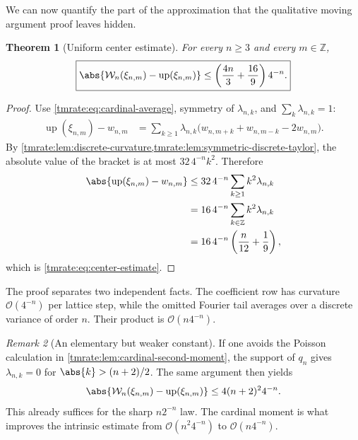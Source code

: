 \documentclass[11pt,oneside]{article}
\newtheorem{theorem}{Theorem}[section]
\theoremstyle{definition}
\theoremstyle{remark}
\newtheorem{remark}[theorem]{Remark}
\newcommand{\Z}{\mathbb Z}
\newcommand{\Up}{\operatorname{up}}
\newcommand{\bigO}{\mathcal O}
\begin{document}
We can now quantify the part of the approximation that the qualitative moving
argument proof leaves hidden.

\begin{theorem}[Uniform center estimate]
\label{tmrate:thm:center-estimate}
For every $n\ge3$ and every $m\in\Z$,
\begin{equation}
 \boxed{\displaystyle
 \abs{\mathcal W_n(\xi_{n,m})-\Up(\xi_{n,m})}
 \le
 \left(\frac{4n}{3}+\frac{16}{9}\right)4^{-n}.}            \label{tmrate:eq:center-estimate}
\end{equation}
\end{theorem}

\begin{proof}
Use \eqref{tmrate:eq:cardinal-average}, symmetry of $\lambda_{n,k}$, and
$\sum_k\lambda_{n,k}=1$:
\begin{align*}
 \Up(\xi_{n,m})-w_{n,m}
 &=\sum_{k\ge1}\lambda_{n,k}
   \bigl(w_{n,m+k}+w_{n,m-k}-2w_{n,m}\bigr).
\end{align*}
By \cref{tmrate:lem:discrete-curvature,tmrate:lem:symmetric-discrete-taylor}, the absolute
value of the bracket is at most $32\,4^{-n}k^2$.  Therefore
\begin{align*}
 \abs{\Up(\xi_{n,m})-w_{n,m}}
 &\le32\,4^{-n}\sum_{k\ge1}k^2\lambda_{n,k}\\
 &=16\,4^{-n}\sum_{k\in\Z}k^2\lambda_{n,k}\\
 &=16\,4^{-n}\left(\frac{n}{12}+\frac19\right),
\end{align*}
which is \eqref{tmrate:eq:center-estimate}.
\end{proof}

The proof separates two independent facts.  The coefficient row has curvature
$\bigO(4^{-n})$ per lattice step, while the omitted Fourier tail averages over a
discrete variance of order $n$.  Their product is $\bigO(n4^{-n})$.

\begin{remark}[An elementary but weaker constant]
If one avoids the Poisson calculation in \cref{tmrate:lem:cardinal-second-moment}, the
support of $q_n$ gives $\lambda_{n,k}=0$ for
$\abs{k}>(n+2)/2$.  The same argument then yields
\begin{equation*}
 \abs{\mathcal W_n(\xi_{n,m})-\Up(\xi_{n,m})}
 \le4(n+2)^2 4^{-n}.
\end{equation*}
This already suffices for the sharp $n2^{-n}$ law.  The cardinal moment is what
improves the intrinsic estimate from $\bigO(n^2 4^{-n})$ to
$\bigO(n4^{-n})$.
\end{remark}
\end{document}
